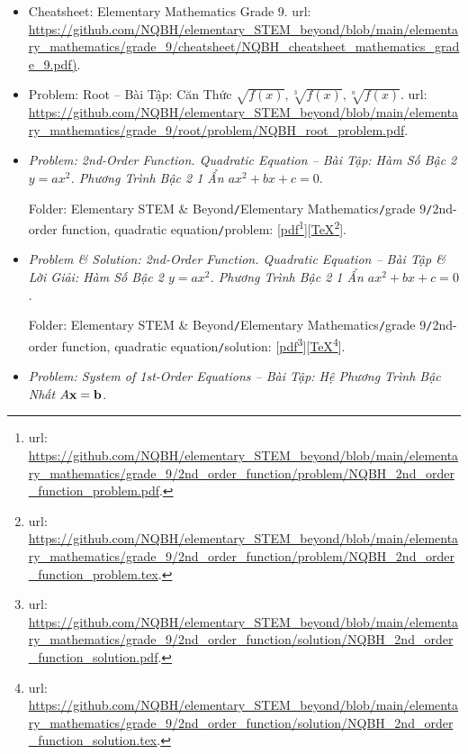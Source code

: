 \documentclass[12pt]{article}
\begin{document}
\begin{itemize}
	\item Cheatsheet: Elementary Mathematics Grade 9. {\sc url}: \url{https://github.com/NQBH/elementary_STEM_beyond/blob/main/elementary_mathematics/grade_9/cheatsheet/NQBH_cheatsheet_mathematics_grade_9.pdf)}.	
	\item Problem: Root -- Bài Tập: Căn Thức $\sqrt{f(x)},\sqrt[3]{f(x)},\sqrt[n]{f(x)}$. {\sc url}: \url{https://github.com/NQBH/elementary_STEM_beyond/blob/main/elementary_mathematics/grade_9/root/problem/NQBH_root_problem.pdf}.	
	\item {\it Problem: 2nd-Order Function. Quadratic Equation -- Bài Tập: Hàm Số Bậc 2 $y = ax^2$. Phương Trình Bậc 2 1 Ẩn $ax^2 + bx + c = 0$}.
	
	Folder: {\sf Elementary STEM \& Beyond{\tt/}Elementary Mathematics{\tt/}grade 9{\tt/}2nd-order function, quadratic equation{\tt/}problem}: [\href{https://github.com/NQBH/elementary_STEM_beyond/blob/main/elementary_mathematics/grade_9/2nd_order_function/problem/NQBH_2nd_order_function_problem.pdf}{pdf}\footnote{{\sc url}: \url{https://github.com/NQBH/elementary_STEM_beyond/blob/main/elementary_mathematics/grade_9/2nd_order_function/problem/NQBH_2nd_order_function_problem.pdf}.}][\href{https://github.com/NQBH/elementary_STEM_beyond/blob/main/elementary_mathematics/grade_9/2nd_order_function/problem/NQBH_2nd_order_function_problem.tex}{\TeX}\footnote{{\sc url}: \url{https://github.com/NQBH/elementary_STEM_beyond/blob/main/elementary_mathematics/grade_9/2nd_order_function/problem/NQBH_2nd_order_function_problem.tex}.}].
	\item {\it Problem \& Solution: 2nd-Order Function. Quadratic Equation -- Bài Tập \& Lời Giải: Hàm Số Bậc 2 $y = ax^2$. Phương Trình Bậc 2 1 Ẩn $ax^2 + bx + c = 0$}.
	
	Folder: {\sf Elementary STEM \& Beyond{\tt/}Elementary Mathematics{\tt/}grade 9{\tt/}2nd-order function, quadratic equation{\tt/}solution}: [\href{https://github.com/NQBH/elementary_STEM_beyond/blob/main/elementary_mathematics/grade_9/2nd_order_function/solution/NQBH_2nd_order_function_solution.pdf}{pdf}\footnote{{\sc url}: \url{https://github.com/NQBH/elementary_STEM_beyond/blob/main/elementary_mathematics/grade_9/2nd_order_function/solution/NQBH_2nd_order_function_solution.pdf}.}][\href{https://github.com/NQBH/elementary_STEM_beyond/blob/main/elementary_mathematics/grade_9/2nd_order_function/solution/NQBH_2nd_order_function_solution.tex}{\TeX}\footnote{{\sc url}: \url{https://github.com/NQBH/elementary_STEM_beyond/blob/main/elementary_mathematics/grade_9/2nd_order_function/solution/NQBH_2nd_order_function_solution.tex}.}].
	\item {\it Problem: System of 1st-Order Equations -- Bài Tập: Hệ Phương Trình Bậc Nhất $A{\bf x} = {\bf b}$}.
	

\end{itemize}
\end{document}
